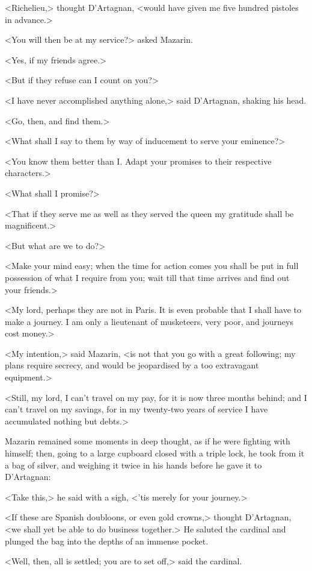 <Richelieu,> thought D'Artagnan, <would have given me five hundred pistoles in advance.>

<You will then be at my service?> asked Mazarin.

<Yes, if my friends agree.>

<But if they refuse can I count on you?>

<I have never accomplished anything alone,> said D'Artagnan, shaking his head.

<Go, then, and find them.>

<What shall I say to them by way of inducement to serve your eminence?>

<You know them better than I. Adapt your promises to their respective characters.>

<What shall I promise?>

<That if they serve me as well as they served the queen my gratitude shall be magnificent.>

<But what are we to do?>

<Make your mind easy; when the time for action comes you shall be put in full possession of what I require from you; wait till that time arrives and find out your friends.>

<My lord, perhaps they are not in Paris. It is even probable that I shall have to make a journey. I am only a lieutenant of musketeers, very poor, and journeys cost money.>

<My intention,> said Mazarin, <is not that you go with a great following; my plans require secrecy, and would be jeopardised by a too extravagant equipment.>

<Still, my lord, I can't travel on my pay, for it is now three months behind; and I can't travel on my savings, for in my twenty-two years of service I have accumulated nothing but debts.>

Mazarin remained some moments in deep thought, as if he were fighting with himself; then, going to a large cupboard closed with a triple lock, he took from it a bag of silver, and weighing it twice in his hands before he gave it to D'Artagnan:

<Take this,> he said with a sigh, <'tis merely for your journey.>

<If these are Spanish doubloons, or even gold crowns,> thought D'Artagnan, <we shall yet be able to do business together.> He saluted the cardinal and plunged the bag into the depths of an immense pocket.

<Well, then, all is settled; you are to set off,> said the cardinal.

